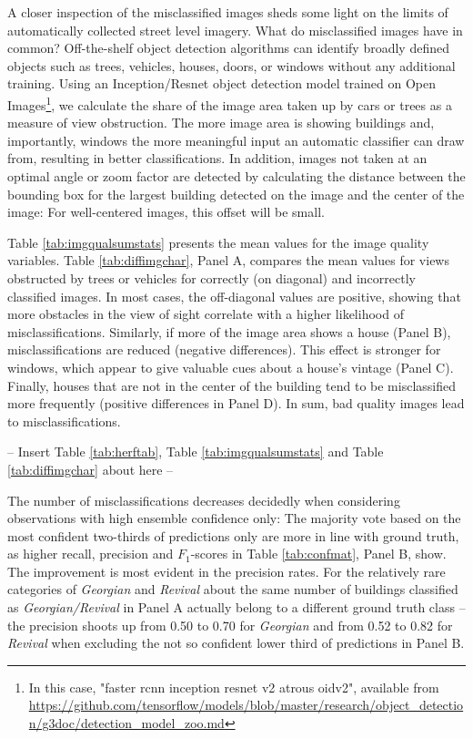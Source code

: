 \documentclass[]{article}
\let\rmarkdownfootnote\footnote%
\def\footnote{\protect\rmarkdownfootnote}
\begin{document}
A closer inspection of the misclassified images sheds some light on the
limits of automatically collected street level imagery. What do
misclassified images have in common? Off-the-shelf object detection
algorithms can identify broadly defined objects such as trees, vehicles,
houses, doors, or windows without any additional training. Using an
Inception/Resnet object detection model trained on Open
Images\footnote{In this case, "faster rcnn inception resnet v2 atrous oidv2", available from \url{https://github.com/tensorflow/models/blob/master/research/object_detection/g3doc/detection_model_zoo.md}},
we calculate the share of the image area taken up by cars or trees as a
measure of view obstruction. The more image area is showing buildings
and, importantly, windows the more meaningful input an automatic
classifier can draw from, resulting in better classifications. In
addition, images not taken at an optimal angle or zoom factor are
detected by calculating the distance between the bounding box for the
largest building detected on the image and the center of the image: For
well-centered images, this offset will be small.

Table \ref{tab:imgqualsumstats} presents the mean values for the image
quality variables. Table \ref{tab:diffimgchar}, Panel A, compares the
mean values for views obstructed by trees or vehicles for correctly (on
diagonal) and incorrectly classified images. In most cases, the
off-diagonal values are positive, showing that more obstacles in the
view of sight correlate with a higher likelihood of misclassifications.
Similarly, if more of the image area shows a house (Panel B),
misclassifications are reduced (negative differences). This effect is
stronger for windows, which appear to give valuable cues about a house's
vintage (Panel C). Finally, houses that are not in the center of the
building tend to be misclassified more frequently (positive differences
in Panel D). In sum, bad quality images lead to misclassifications.

\begin{center}
  -- Insert Table \ref{tab:herftab}, Table \ref{tab:imgqualsumstats} and Table \ref{tab:diffimgchar} about here --
\end{center}

The number of misclassifications decreases decidedly when considering
observations with high ensemble confidence only: The majority vote based
on the most confident two-thirds of predictions only are more in line
with ground truth, as higher recall, precision and \(F_1\)-scores in
Table \ref{tab:confmat}, Panel B, show. The improvement is most evident
in the precision rates. For the relatively rare categories of
\emph{Georgian} and \emph{Revival} about the same number of buildings
classified as \emph{Georgian/Revival} in Panel A actually belong to a
different ground truth class -- the precision shoots up from 0.50 to
0.70 for \emph{Georgian} and from 0.52 to 0.82 for \emph{Revival} when
excluding the not so confident lower third of predictions in Panel B.
\end{document}
